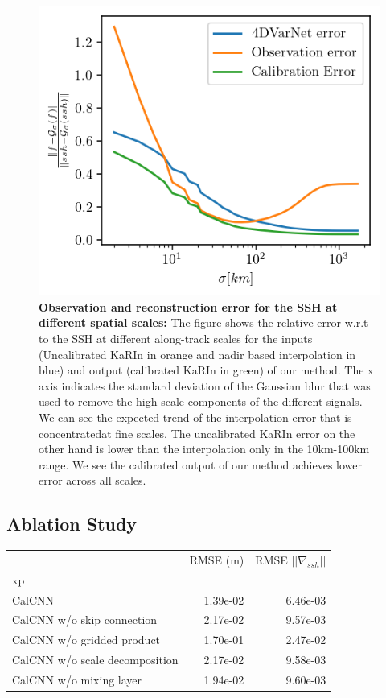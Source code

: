 \begin{bibunit}
\begin{figure}[!t]
    \centering
    \includegraphics[width=\linewidth]
    {00_Calib/norm_cumsum_highpass_errors_1.png}%
    \caption{{\bf Observation and reconstruction error for the SSH at different spatial scales:}  The figure shows the relative error w.r.t to the SSH at different along-track scales for the inputs (Uncalibrated KaRIn in orange and nadir based interpolation in blue) and output (calibrated KaRIn in green) of our method. The x axis indicates the standard deviation of the Gaussian blur that was used to remove the high scale components of the different signals. We can see the expected trend of the interpolation error that is concentratedat fine scales. The uncalibrated KaRIn  error on the other hand is lower than the interpolation only in the 10km-100km range. We see the calibrated output of our method achieves lower error across all scales.}
    \label{c3fig:err_scales}%
\end{figure}


\subsection*{Ablation Study}
\label{c3subsec:ablation}
\noindent

\begin{table}[t]
\centering
\begin{tabular}{lrr}
\toprule
 & RMSE (m) & RMSE $|| \nabla_{ssh} ||$ \\
xp &  &  \\
\midrule
CalCNN & 1.39e-02 & 6.46e-03 \\
CalCNN w/o skip connection & 2.17e-02 & 9.57e-03 \\
CalCNN w/o gridded product & 1.70e-01 & 2.47e-02 \\
CalCNN w/o scale decomposition & 2.17e-02 & 9.58e-03 \\
CalCNN w/o mixing layer & 1.94e-02 & 9.60e-03 \\
\bottomrule
\end{tabular}


\end{table}
\end{bibunit}
